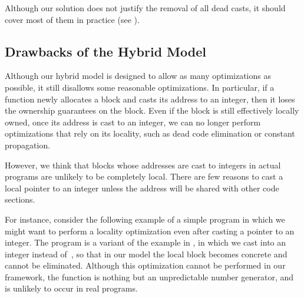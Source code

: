Although our solution does not justify the removal of all dead casts,
it should cover most of them in practice (see ).



\subsection{Drawbacks of the Hybrid Model}
\label{sec:intptrcast:formal-semantics:drawbacks}


Although our hybrid model is designed to allow as many optimizations as possible, it still disallows some reasonable optimizations. 
In particular, if a function newly allocates a block and casts its address to an
integer, then it loses the ownership guarantees on the block. 
Even if the block is still effectively locally owned, 
once its address is cast to an integer, we can no longer perform optimizations that rely on its locality, such as dead code elimination or constant propagation. 

However, we think that blocks whose addresses are cast to
integers in actual programs are unlikely to be completely local. There are few reasons to cast a local pointer to an integer unless the address will be shared with other code sections. 

For instance, consider the following example of a simple program in which we might want to perform a locality optimization even after casting a pointer to an integer.
The program is a variant of 
the example in , in which we cast  into an integer instead of~,
so that in our model the local block becomes concrete and cannot be eliminated.
Although this optimization cannot be performed in our framework, the function  is nothing but an %
unpredictable number generator, and is unlikely to occur in real programs.

